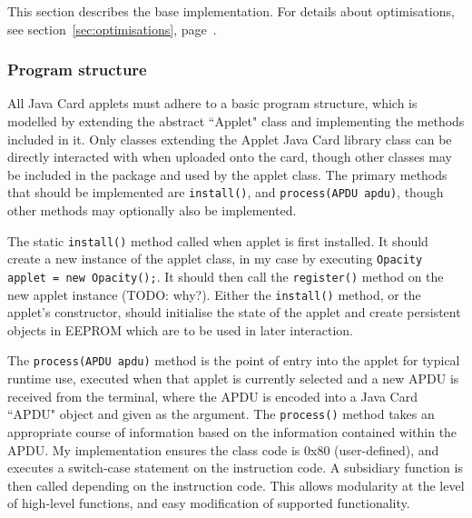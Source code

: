 \documentclass[12pt,a4paper]{article}
\begin{document}

This section describes the base implementation. For details about optimisations, see section~\ref{sec:optimisations}, page~\pageref{sec:optimisations}.

\subsubsection{Program structure}

All Java Card applets must adhere to a basic program structure, which is modelled by extending the abstract ``Applet" class and implementing the methods included in it. Only classes extending the Applet Java Card library class can be directly interacted with when uploaded onto the card, though other classes may be included in the package and used by the applet class. The primary methods that should be implemented are \verb|install()|, and \verb|process(APDU apdu)|, though other methods may optionally also be implemented.

The static \verb|install()| method called when applet is first installed. It should create a new instance of the applet class, in my case by executing \verb|Opacity applet = new Opacity();|. It should then call the \verb|register()| method on the new applet instance (TODO: why?). Either the \verb|install()| method, or the applet's constructor, should initialise the state of the applet and create persistent objects in EEPROM which are to be used in later interaction.

The \verb|process(APDU apdu)| method is the point of entry into the applet for typical runtime use, executed when that applet is currently selected and a new APDU is received from the terminal, where the APDU is encoded into a Java Card ``APDU" object and given as the argument. The \verb|process()| method takes an appropriate course of information based on the information contained within the APDU. My implementation ensures the class code is 0x80 (user-defined), and executes a switch-case statement on the instruction code. A subsidiary function is then called depending on the instruction code. This allows modularity at the level of high-level functions, and easy modification of supported functionality.


\end{document}
